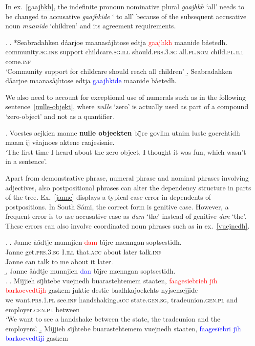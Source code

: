 \documentclass[free]{flammie}
\begin{document}
In ex.~\ref{gaajhkh}, the indefinite pronoun nominative plural \textit{gaajhkh}
`all' needs to be changed to accusative \textit{gaajhkide} ` to all' because of
the subsequent accusative noun \textit{maanide} `children' and its agreement
requirements.

\ex.
\ag. *Seabradahken dåarjoe maanasåjhtose edtja \textcolor{red}{gaajhkh} maanide
båetedh.\label{gaajhkh}\\
community\textsc{.sg.ine} support childcare\textsc{.sg.ill}
should\textsc{.prs.3.sg} all\textsc{.pl.nom} child\textsc{.pl.ill}
come\textsc{.inf}\\
`Community support for childcare should reach all children'
\b. Seabradahken dåarjoe maanasåjhtose edtja \textcolor{blue}{gaajhkide} maanide
båetedh.

We also need to account for exceptional use of numerals such as in the following
sentence~\ref{nulle-objekt}, where \textit{nulle} `zero' is actually used as
part of a compound `zero-object' and not as a quantifier.

\ex. Voestes aejkien manne \textbf{nulle objeekten} bïjre govlim utnim luste
goerehtidh maam ij våajnoes aktene raajesisnie.\label{nulle-objekt}\\
`The first time I heard about the zero object, I thought it was fun, which
wasn't in a sentence'.

Apart from demonstrative phrase, numeral phrase and nominal phrases involving
adjectives, also postpositional phrases can alter the dependency structure in
parts of the tree. Ex.~\ref{janne} displays a typical case error in dependents
of postpositions. In South Sámi, the correct form is genitive case. However, a
frequent error is to use accusative case as \textit{dam} `the' instead of
genitive \textit{dan}  `the'. These errors can also involve coordinated noun
phrases such as in ex.~\ref{vuejnedh}.

\ex.
\ag. Janne åådtje munnjien \textcolor{red}{dam} bïjre mænngan soptsestidh.\label{janne}\\
Janne get\textsc{.prs.3.sg} I\textsc{.ill} that\textsc{.acc} about later talk\textsc{.inf}\\
Janne can talk to me about it later.\\
\b. Janne åådtje munnjien \textcolor{blue}{dan} bïjre mænngan soptsestidh.\\

\ex.
\ag. Mijjieh sïjhtebe vuejnedh buarastehtemem staaten,
\textcolor{red}{faagesiebrieh jïh barkoevedtijh} gaskem juktie destie
baalhkajoekehts nyjsenæjjide\label{vuejnedh}\\
we want\textsc{.prs.1.pl} see\textsc{.inf} handshaking\textsc{.acc}
state\textsc{.gen.sg}, tradeunion\textsc{.gen.pl} and employer\textsc{.gen.pl}
between\\
`We want to see a handshake between the state, the tradeunion and the employers'.
\b. Mijjieh sïjhtebe buarastehtemem vuejnedh staaten,
\textcolor{blue}{faagesïebri jïh barkoevedtiji} gaskem\\
\end{document}
